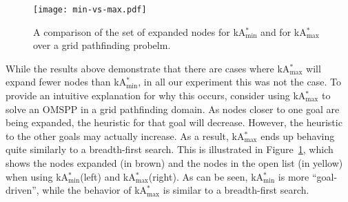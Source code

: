\documentclass[smallextended]{svjour3}       %
\newcommand{\omspp}{\ac{OMSPP}\xspace}
\newcommand{\kastar}{kA$^*$\xspace}
\newcommand{\kastarvar}[1]{\textup{kA}$^*_{#1}$\xspace}
\newcommand{\kastarmin}{\kastarvar{\min}}
\newcommand{\kastarmax}{\kastarvar{\max}}
\newcommand{\axiomcons}{consistent\xspace}
\begin{document}



\begin{figure}
    \centering
    \texttt{[image: min-vs-max.pdf]}
    \caption{A comparison of the set of expanded nodes for \kastarmin and for \kastarmax over a grid pathfinding probelm.}
    \label{fig:min-vs-max}
\end{figure}

While the results above demonstrate that there are cases where \kastarmax will expand fewer nodes than \kastarmin, in all our experiment this was not the case. 
To provide an intuitive explanation for why this occurs, consider using \kastarmax to solve an \omspp in a grid pathfinding domain. As nodes closer to one goal are being expanded, the heuristic for that goal will decrease. However, the heuristic to the other goals may actually increase. As a result, \kastarmax ends up behaving quite similarly to a breadth-first search. This is illustrated in Figure~\ref{fig:min-vs-max}, which shows the nodes expanded (in brown) and the nodes in the open list (in yellow) when using \kastarmin (left) and \kastarmax (right). As can be seen, \kastarmin is more ``goal-driven'', while the behavior of \kastarmax is similar to a breadth-first search.  
\end{document}
